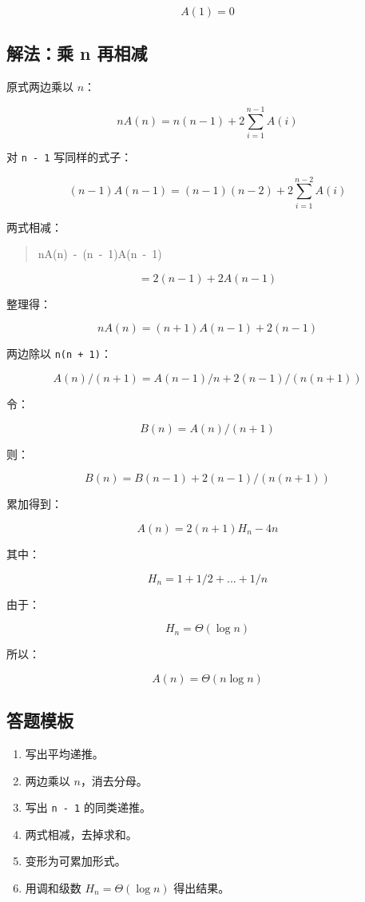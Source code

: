 \documentclass[UTF8,zihao=-4]{ctexart}
\begin{document}
\[A(1) = 0\]

\subsection*{解法：乘 n 再相减}

原式两边乘以 $n$：

\[nA(n) = n(n - 1) + 2 \sum_{i=1}^{n-1} A(i)\]

对 \texttt{n - 1} 写同样的式子：

\[(n - 1)A(n - 1) = (n - 1)(n - 2) + 2 \sum_{i=1}^{n-2} A(i)\]

两式相减：

\begin{quote}
\small\ttfamily\raggedright
\relax nA(n)\ -\ (n\ -\ 1)A(n\ -\ 1)\\
\end{quote}
\[= 2(n - 1) + 2A(n - 1)\]

整理得：

\[nA(n) = (n + 1)A(n - 1) + 2(n - 1)\]

两边除以 \texttt{n(n + 1)}：

\[A(n)/(n + 1) = A(n - 1)/n + 2(n - 1)/(n(n + 1))\]

令：

\[B(n) = A(n)/(n + 1)\]

则：

\[B(n) = B(n - 1) + 2(n - 1)/(n(n + 1))\]

累加得到：

\[A(n) = 2(n + 1)H_{n} - 4n\]

其中：

\[H_{n} = 1 + 1/2 + ... + 1/n\]

由于：

\[H_{n} = \Theta(\log n)\]

所以：

\[A(n) = \Theta(n \log n)\]

\subsection*{答题模板}

\begin{enumerate}
\item 写出平均递推。
\item 两边乘以 $n$，消去分母。
\item 写出 \texttt{n - 1} 的同类递推。
\item 两式相减，去掉求和。
\item 变形为可累加形式。
\item 用调和级数 $H_n = \Theta(\log n)$ 得出结果。
\end{enumerate}
\end{document}
